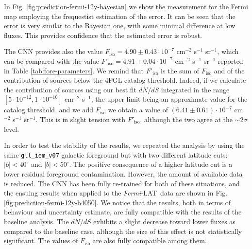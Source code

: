 \documentclass[a4paper,11pt]{article}
\newcommand{\fermi}{\textsl{Fermi}-LAT\ }
\newcommand{\fiso}{{F_\textrm{iso}}}
\newcommand{\dnds}{dN/dS }
\begin{document}
In Fig. \ref{fig:prediction-fermi-12y-bayesian} we show the measurement for the Fermi map employing the frequestist estimation of the error. It can be seen that the error is very similar to the Bayesian one, with some minimal difference at low fluxes. This provides confidence that the estimated error is robust. 






The CNN provides also the value $\fiso=4.90 \pm 0.43 \cdot 10^{-7}$ cm$^{-2}$ s$^{-1}$ sr$^{-1}$, 
which can be compared with the value $F'_\textrm{iso}=4.91 \pm 0.04 \cdot 10^{-7}$ cm$^{-2}$ s$^{-1}$ sr$^{-1}$ reported in Table \ref{tab:fore-parameters}.
We remind that $F'_\textrm{iso}$ is the sum of $\fiso$ and of the contribution of sources below the 4FGL catalog threshold. Indeed, if we  calculate the contribution of sources using our best fit $\dnds$ integrated in the range $[5 \cdot 10^{-12}, 1 \cdot 10^{-10}]$ cm$^{-2}$ s$^{-1}$, the upper limit being an approximate value for the catalog threshold, and we add $\fiso$  we obtain a value of {$(6.41 \pm 0.61)\cdot 10^{-7}$ cm$^{-2}$ s$^{-1}$} sr$^{-1}$.
This is in slight tension with $F'_\textrm{iso}$, although the two agree at the $\sim 2\sigma$ level.


In order to test the stability of the results, we repeated the analysis by using the same \verb|gll_iem_v07| galactic foreground but with two different latitude cuts: $|b|<40^\circ$ and $|b|<50^\circ$. The positive consequence of a higher latitude cut is a lower residual foreground contamination. However, the amount of available data is reduced. The CNN has been fully re-trained for both of these situations, and the ensuing results when applied to the \fermi data are shown in Fig. \ref{fig:prediction-fermi-12y-b4050}. We notice that the results, both in terms of behaviour and uncertainty estimate, are fully compatible with the results of the baseline analysis. The $\dnds$ exhibits a slight decrease toward lower fluxes as compared to the baseline case, although the size of this effect is not statistically significant. The values of $\fiso$ are also fully compatible among them.
\end{document}

